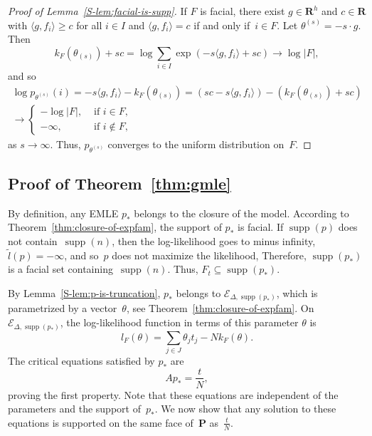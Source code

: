 \documentclass[aos,noinfoline]{imsart}
\DeclareMathOperator{\supp}{supp}
\def\R{{\mathbf R}}
\newcommand{\Ecal}{\mathcal{E}}
\newcommand{\Pbf}{\mathbf{P}}
\newcommand{\gmle}{p_{*}}
\theoremstyle{remark}
\theoremstyle{definition}
\begin{document}
\begin{proof}[Proof of Lemma~\ref{S-lem:facial-is-supp}]
  If $F$ is facial, there exist $g\in\R^{h}$ and $c\in\R$ with $\langle g,f_{i}\rangle\ge c$ for all $i\in I$ and
  $\langle g,f_{i}\rangle=c$ if and only if~$i\in F$.  Let $\theta^{(s)}=-s\cdot g$.  Then
  \begin{equation*}
    k_{F}(\theta_{(s)}) + sc = \log \sum_{i\in I}\exp(- s\langle g,f_{i}\rangle + sc) 
    \to \log|F|,
  \end{equation*}
  and so
  \begin{multline*}
    \log p_{\theta^{(s)}}(i) = - s \langle g, f_{i}\rangle - k_{F}(\theta_{(s)}) 
    = (sc - s \langle g, f_{i}\rangle) - (k_{F}(\theta_{(s)}) + sc)
    \\
    \to
    \begin{cases}
      - \log|F|, & \text{ if } i\in F, \\
      -  \infty, & \text{ if } i\notin F,
    \end{cases}
  \end{multline*}
  as $s\to\infty$.  Thus, $p_{\theta^{(s)}}$ converges to the uniform distribution on~$F$.
\end{proof}

\subsection{Proof of Theorem~\ref{thm:gmle}}
\label{S-sec:proof2}

By definition, any EMLE $\gmle$ belongs to the closure of the model.  According to Theorem~\ref{thm:closure-of-expfam},
the support of $\gmle$ is facial.  If $\supp(p)$ does not contain~$\supp(n)$, then the log-likelihood goes to minus infinity, $\tilde
l(p)=-\infty$, and so~$p$ does not maximize the likelihood, Therefore, $\supp(\gmle)$ is a facial set containing~$\supp(n)$.
Thus, $F_{t}\subseteq\supp(\gmle)$.

By Lemma~\ref{S-lem:p-is-truncation}, $\gmle$ belongs to $\Ecal_{\Delta,\supp(\gmle)}$, which is parametrized by a
vector~$\theta$, see Theorem~\ref{thm:closure-of-expfam}.
On $\Ecal_{\Delta,\supp(\gmle)}$, the log-likelihood function in terms of this parameter $\theta$ is
\begin{equation*}
  l_{F}(\theta) = \sum_{j\in J}\theta_jt_j-N k_{F}(\theta).
\end{equation*}
The critical equations satisfied by $p_{*}$ are
\begin{equation*}
  A \gmle = \frac{t}{N},
\end{equation*}
proving the first property.  Note that these equations are independent of the parameters and the support of~$\gmle$.  We
now show that any solution to these equations is supported on the same face of~$\Pbf$ as~$\frac{t}{N}$.
\end{document}

